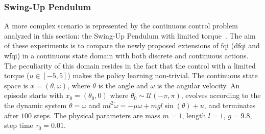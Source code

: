 \subsubsection{Swing-Up Pendulum}
A more complex scenario is represented by the continuous control problem analyzed in this section: the Swing-Up Pendulum with limited torque~\cite{doya2000reinforcement}.
The aim of these experiments is to compare the newly proposed extensions of \gls{fqi} (\gls{dfqi} and \gls{wfqi}) in a continuous state domain with both discrete and continuous actions.
The peculiarity of this domain resides in the fact that the control with a limited torque ($u \in [-5,5]$) makes the policy learning non-trivial.
The continuous state space is $x = (\theta, \omega)$, where $\theta$ is the angle and $\omega$ is the angular velocity.
An episode starts with $x_0 = (\theta_0, 0)$ where $\theta_0 \sim \mathcal{U}(-\pi, \pi)$, evolves according to the the dynamic system $\dot{\theta}=\omega$ and $ml^2\dot{\omega}=-\mu\omega + mgl \sin(\theta) + u$, and terminates after $100$ steps. The physical parameters are mass $m=1$, length $l=1$, $g=9.8$, step time $\tau_0=0.01$.
